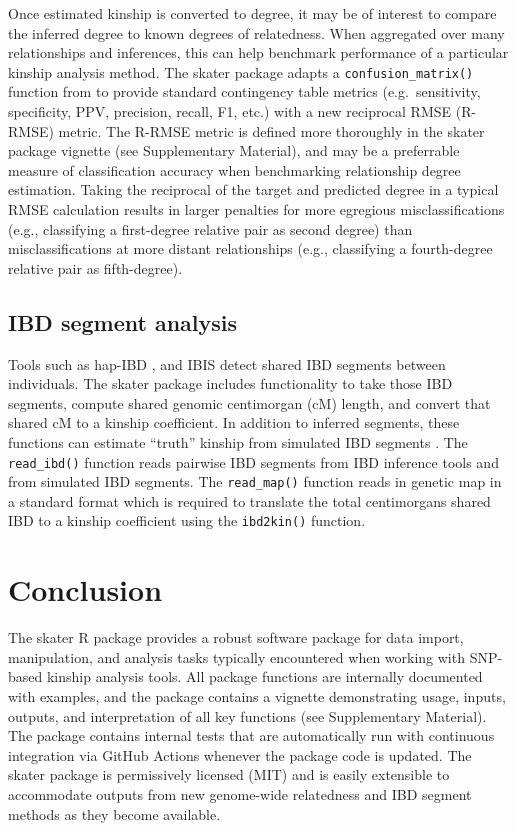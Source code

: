 \documentclass{bioinfo}
\begin{document}
Once estimated kinship is converted to degree, it may be of interest to
compare the inferred degree to known degrees of relatedness. When
aggregated over many relationships and inferences, this can help
benchmark performance of a particular kinship analysis method. The
skater package adapts a \texttt{confusion\_matrix()} function from
\citet{clark2021} to provide standard contingency table metrics
(e.g.~sensitivity, specificity, PPV, precision, recall, F1, etc.) with a
new reciprocal RMSE (R-RMSE) metric. The R-RMSE metric is defined more
thoroughly in the skater package vignette (see Supplementary Material),
and may be a preferrable measure of classification accuracy when
benchmarking relationship degree estimation. Taking the reciprocal of
the target and predicted degree in a typical RMSE calculation results in
larger penalties for more egregious misclassifications (e.g.,
classifying a first-degree relative pair as second degree) than
misclassifications at more distant relationships (e.g., classifying a
fourth-degree relative pair as fifth-degree).

\subsection{IBD segment analysis}

Tools such as hap-IBD \citep{zhou2020}, and IBIS \citep{seidman2020}
detect shared IBD segments between individuals. The skater package
includes functionality to take those IBD segments, compute shared
genomic centimorgan (cM) length, and convert that shared cM to a kinship
coefficient. In addition to inferred segments, these functions can
estimate ``truth'' kinship from simulated IBD segments
\citep{caballero2019}. The \texttt{read\_ibd()} function reads pairwise
IBD segments from IBD inference tools and from simulated IBD segments.
The \texttt{read\_map()} function reads in genetic map in a standard
format which is required to translate the total centimorgans shared IBD
to a kinship coefficient using the \texttt{ibd2kin()} function.

\section{Conclusion}

The skater R package provides a robust software package for data import,
manipulation, and analysis tasks typically encountered when working with
SNP-based kinship analysis tools. All package functions are internally
documented with examples, and the package contains a vignette
demonstrating usage, inputs, outputs, and interpretation of all key
functions (see Supplementary Material). The package contains internal
tests that are automatically run with continuous integration via GitHub
Actions whenever the package code is updated. The skater package is
permissively licensed (MIT) and is easily extensible to accommodate
outputs from new genome-wide relatedness and IBD segment methods as they
become available.
\end{document}

